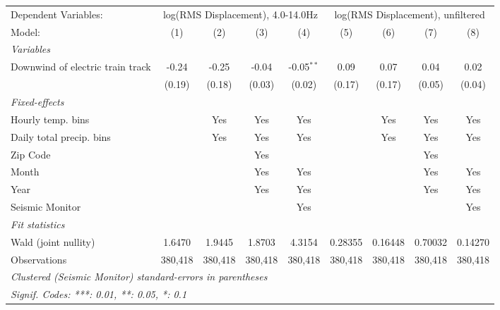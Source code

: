 
\begingroup
\centering
\begin{tabular}{lcccccccc}
   \tabularnewline \midrule \midrule
   Dependent Variables: & \multicolumn{4}{c}{log(RMS Displacement), 4.0-14.0Hz} & \multicolumn{4}{c}{log(RMS Displacement), unfiltered}\\
   Model:                           & (1)     & (2)     & (3)     & (4)          & (5)     & (6)     & (7)     & (8)\\  
   \midrule
   \emph{Variables}\\
   Downwind of electric train track & -0.24   & -0.25   & -0.04   & -0.05$^{**}$ & 0.09    & 0.07    & 0.04    & 0.02\\   
                                    & (0.19)  & (0.18)  & (0.03)  & (0.02)       & (0.17)  & (0.17)  & (0.05)  & (0.04)\\   
   \midrule
   \emph{Fixed-effects}\\
   Hourly temp. bins                &         & Yes     & Yes     & Yes          &         & Yes     & Yes     & Yes\\  
   Daily total precip. bins         &         & Yes     & Yes     & Yes          &         & Yes     & Yes     & Yes\\  
   Zip Code                         &         &         & Yes     &              &         &         & Yes     & \\  
   Month                            &         &         & Yes     & Yes          &         &         & Yes     & Yes\\  
   Year                             &         &         & Yes     & Yes          &         &         & Yes     & Yes\\  
   Seismic Monitor                  &         &         &         & Yes          &         &         &         & Yes\\  
   \midrule
   \emph{Fit statistics}\\
   Wald (joint nullity)             & 1.6470  & 1.9445  & 1.8703  & 4.3154       & 0.28355 & 0.16448 & 0.70032 & 0.14270\\  
   Observations                     & 380,418 & 380,418 & 380,418 & 380,418      & 380,418 & 380,418 & 380,418 & 380,418\\  
   \midrule \midrule
   \multicolumn{9}{l}{\emph{Clustered (Seismic Monitor) standard-errors in parentheses}}\\
   \multicolumn{9}{l}{\emph{Signif. Codes: ***: 0.01, **: 0.05, *: 0.1}}\\
\end{tabular}
\par\endgroup


